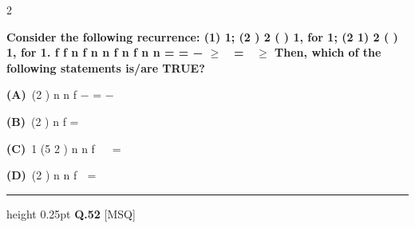 \documentclass[a4paper,10pt,twoside]{article}
\begin{document}
\begin{multicols}{2}
{\bfseries Consider the following recurrence:
(1)
1;
(2 )
2 ( )
1,
for
1;
(2
1)
2 ( )
1,
for
1.
f
f
n
f n
n
f
n
f n
n
=
=
−
$\ge$

=

$\ge$
Then, which of the following statements is/are TRUE? \par}
\par\vspace{2pt}\noindent
\textbf{(A)}~(2 )   \newline n \newline n \newline f \newline − \newline = \newline −\par\vspace{2pt}\noindent
\textbf{(B)}~(2 )  \newline n \newline f \newline =\par\vspace{2pt}\noindent
\textbf{(C)}~1 \newline (5 2 )   \newline n \newline n \newline f \newline  \newline  \newline = \newline \par\vspace{2pt}\noindent
\textbf{(D)}~(2 )   \newline n \newline n \newline f \newline  \newline = \newline 
\par\vspace{6pt}\hrule height 0.25pt\vspace{6pt}
\noindent\textbf{Q.52} \hfill {\footnotesize\textsf{[MSQ]}}
\par\vspace{2pt}

\end{multicols}
\end{document}
